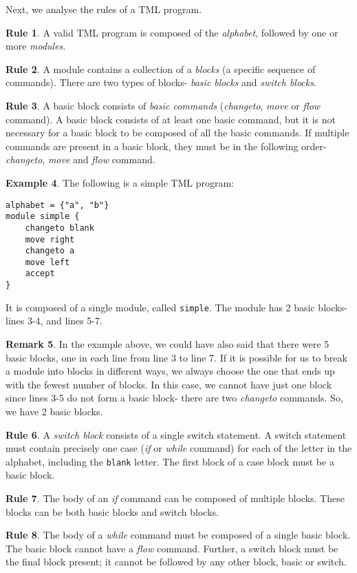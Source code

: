 \documentclass{article}
\theoremstyle{definition}
\newtheorem{rules}{Rule}[subsection]
\newtheorem{remark}[rules]{Remark}
\newtheorem{example}[rules]{Example}
\theoremstyle{plain}
\begin{document}
    Next, we analyse the rules of a TML program.
    \begin{rules}
        A valid TML program is composed of the \emph{alphabet}, followed by one or more \emph{modules}.
    \end{rules}
    \begin{rules}
        A module contains a collection of a \emph{blocks} (a specific sequence of commands). There are two types of blocks- \emph{basic blocks} and \emph{switch blocks}.
    \end{rules}
    \begin{rules}
        A basic block consists of \emph{basic commands} (\textit{changeto}, \textit{move} or \textit{flow} command). A basic block consists of at least one basic command, but it is not necessary for a basic block to be composed of all the basic commands. If multiple commands are present in a basic block, they must be in the following order- \textit{changeto}, \textit{move} and \textit{flow} command.
    \end{rules}
    \begin{example}
        The following is a simple TML program:
\begin{lstlisting}[language=TML]
alphabet = {"a", "b"}
module simple {
    changeto blank
    move right
    changeto a
    move left
    accept
}
\end{lstlisting}
    It is composed of a single module, called \texttt{simple}. The module has 2 basic blocks- lines 3-4, and lines 5-7.
    \end{example}
    \begin{remark}
        In the example above, we could have also said that there were 5 basic blocks, one in each line from line 3 to line 7. If it is possible for us to break a module into blocks in different ways, we always choose the one that ends up with the fewest number of blocks. In this case, we cannot have just one block since lines 3-5 do not form a basic block- there are two \textit{changeto} commands. So, we have 2 basic blocks.
    \end{remark}
    
    \begin{rules}
        A \emph{switch block} consists of a single switch statement. A switch statement must contain precisely one case (\textit{if} or \textit{while} command) for each of the letter in the alphabet, including the \texttt{blank} letter. The first block of a case block must be a basic block.
    \end{rules}
    \begin{rules}
        The body of an \textit{if} command can be composed of multiple blocks. These blocks can be both basic blocks and switch blocks.
    \end{rules}
    \begin{rules}
        The body of a \textit{while} command must be composed of a single basic block. The basic block cannot have a \textit{flow} command. Further, a switch block must be the final block present; it cannot be followed by any other block, basic or switch.
    \end{rules}
    
\end{document}
